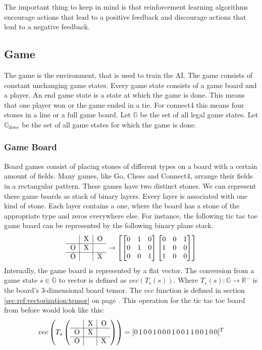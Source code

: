 \documentclass[12pt]{article}
\newcommand{\sectionref}[1]{section \ref{#1} on page \pageref{#1}}
\newcommand{\ticTacToe}[9]{
\begin{tabular}{p{7px}|p{7px}|p{7px}}
  #1 & #2 & #3 \\      \hline
  #4 & #5 & #6 \\      \hline
  #7 & #8 & #9 \\
\end{tabular}
}
\begin{document}
The important thing to keep in mind is that reinforcement learning algorithms encourage actions that lead to a positive feedback and discourage actions that lead to a negative feedback.
\subsection{Game}
The game is the environment, that is used to train the AI. The game consists of constant unchanging game states. Every game state consists of a game board and a player. An end game state is a state at which the game is done. This means that one player won or the game ended in a tie. For connect4 this means four stones in a line or a full game board.
Let \(\mathbb{G}\) be the set of all legal game states.
Let \(\mathbb{G}_{done}\) be the set of all game states for which the game is done. 
\subsubsection{Game Board}
Board games consist of placing stones of different types on a board with a certain amount of fields. Many games, like Go, Chess and Connect4, arrange their fields in a rectangular pattern. These games have two distinct stones. We can represent these game boards as stack of binary layers. Every layer is associated with one kind of stone. Each layer contains a one, where the board has a stone of the appropriate type and zeros everywhere else. For instance, the following tic tac toe game board can be represented by the following binary plane stack.\[
\ticTacToe{}{X}{O}{O}{X}{}{O}{}{X}\to
\left[ 
\begin{bmatrix}
0 & 1 & 0 \\
0 & 1 & 0 \\
0 & 0 & 1 \\
\end{bmatrix}
\begin{bmatrix}
0 & 0 & 1 \\
1 & 0 & 0 \\
1 & 0 & 0 \\
\end{bmatrix}
\right]
\] 
Internally, the game board is represented by a flat vector. The conversion from a game state \(s  \in \mathbb G\) to vector is defined as \(vec(T_s(s))\). Where \(T_s(s):\mathbb G \to \mathbb R^{\cdots}\) is the board's 3-dimensional board tensor. The \(vec\) function is defined in \sectionref{sec:ref:vectorization:tensor}.
This operation for the tic tac toe board from before would look like this:
\[
vec\left(T_s\left(\ticTacToe{}{X}{O}{O}{X}{}{O}{}{X}\right)\right) = 
[0\,1\,0\,0\,1\,0\,0\,0\,1\,0 \,0 \,1\,1\,0\,0\,1\,0\,0]^T
\]
\end{document}
